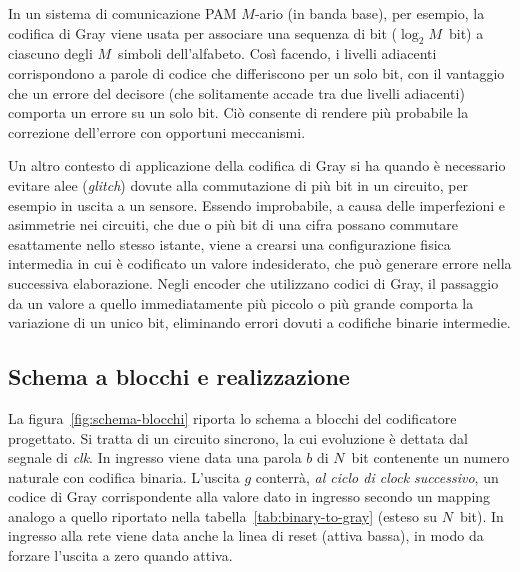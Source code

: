 \documentclass[a4paper,11pt,twoside]{article}
\begin{document}
In un sistema di comunicazione PAM $M$-ario (in banda base), per esempio, la codifica di Gray viene usata per associare una sequenza di bit ($\log_2 M$~bit) a ciascuno degli $M$~simboli dell'alfabeto. Così facendo, i livelli adiacenti corrispondono a parole di codice che differiscono per un solo bit, con il vantaggio che un errore del decisore (che solitamente accade tra due livelli adiacenti) comporta un errore su un solo bit. Ciò consente di rendere più probabile la correzione dell'errore con opportuni meccanismi.

Un altro contesto di applicazione della codifica di Gray si ha quando è necessario evitare alee (\emph{glitch}) dovute alla commutazione di più bit in un circuito, per esempio in uscita a un sensore. Essendo improbabile, a causa delle imperfezioni e asimmetrie nei circuiti, che due o più bit di una cifra possano commutare esattamente nello stesso istante, viene a crearsi una configurazione fisica intermedia in cui è codificato un valore indesiderato, che può generare errore nella successiva elaborazione. Negli encoder che utilizzano codici di Gray, il passaggio da un valore a quello immediatamente più piccolo o più grande comporta la variazione di un unico bit, eliminando errori dovuti a codifiche binarie intermedie.


\subsection{Schema a blocchi e realizzazione}

La figura~\vref{fig:schema-blocchi} riporta lo schema a blocchi del codificatore progettato. Si tratta di un circuito sincrono, la cui evoluzione è dettata dal segnale di \emph{clk}. In ingresso viene data una parola $b$ di $N$~bit contenente un numero naturale con codifica binaria. L'uscita $g$ conterrà, \emph{al ciclo di clock successivo}, un codice di Gray corrispondente alla valore dato in ingresso secondo un mapping analogo a quello riportato nella tabella~\vref{tab:binary-to-gray} (esteso su $N$~bit). In ingresso alla rete viene data anche la linea di reset (attiva bassa), in modo da forzare l'uscita a zero quando attiva.
\end{document}
